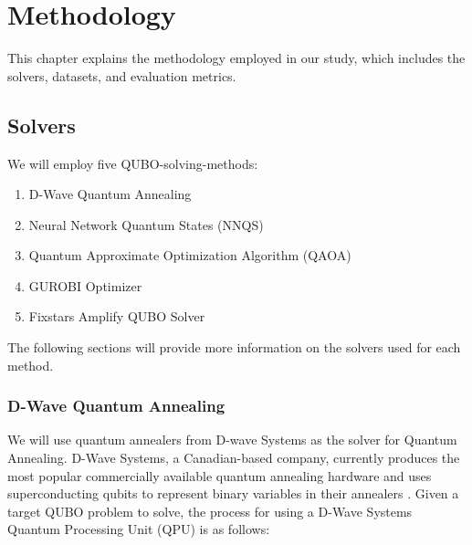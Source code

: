 
\chapter{Methodology}
\label{methodology}
This chapter explains the methodology employed in our study, which includes the solvers, datasets, and evaluation metrics.

\section{Solvers}
We will employ five QUBO-solving-methods:
\begin{enumerate}
    \item D-Wave Quantum Annealing
    \item Neural Network Quantum States (NNQS)
    \item Quantum Approximate Optimization Algorithm (QAOA)
    \item GUROBI Optimizer
    \item Fixstars Amplify QUBO Solver
\end{enumerate}
The following sections will provide more information on the solvers used for each method.

\subsection{D-Wave Quantum Annealing}
We will use quantum annealers from D-wave Systems as the solver for Quantum Annealing. D-Wave Systems, a Canadian-based company, currently produces the most popular commercially available quantum annealing hardware and uses superconducting qubits to represent binary variables in their annealers \cite{b14}.  Given a target QUBO problem to solve, the process for using a D-Wave Systems Quantum Processing Unit (QPU) is as follows:

